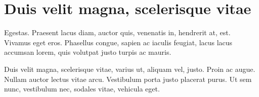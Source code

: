 \section{Duis velit magna, scelerisque vitae}

Egestas. Praesent lacus diam, auctor quis, venenatis in, hendrerit at,
est. Vivamus eget eros. Phasellus congue, sapien ac iaculis feugiat,
lacus lacus accumsan lorem, quis volutpat justo turpis ac mauris.

Duis velit magna, scelerisque vitae, varius ut, aliquam vel, justo.
Proin ac augue. Nullam auctor lectus vitae arcu. Vestibulum porta
justo placerat purus. Ut sem nunc, vestibulum nec, sodales vitae,
vehicula eget.

